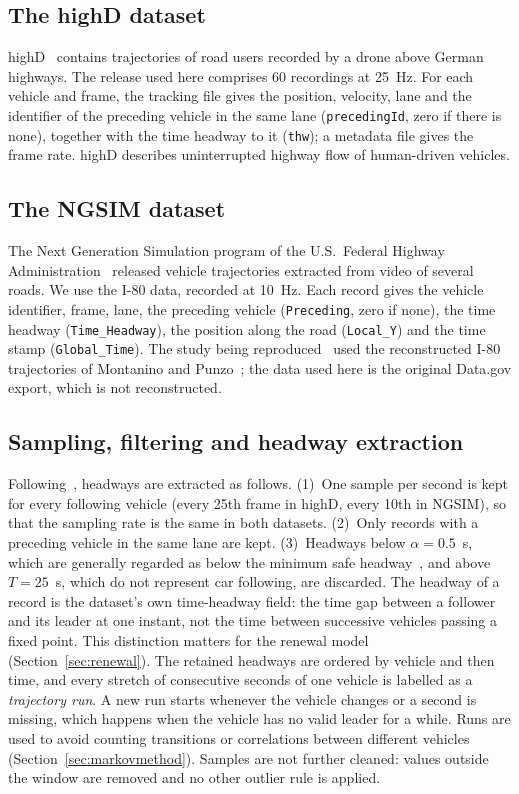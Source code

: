 \documentclass[11pt,a4paper]{article}
\numberwithin{equation}{section}
\begin{document}
\subsection{The highD dataset}
highD~\cite{krajewski2018} contains trajectories of road users recorded by a drone above German highways. The release used here comprises 60
recordings at 25~Hz. For each vehicle and frame, the tracking file gives the position, velocity, lane and the identifier
of the preceding vehicle in the same lane (\texttt{precedingId}, zero if there is none), together with the time headway to it
(\texttt{thw}); a metadata file gives the frame rate. highD describes uninterrupted highway flow of human-driven vehicles.

\subsection{The NGSIM dataset}
The Next Generation Simulation program of the U.S.\ Federal Highway Administration~\cite{ngsim} released vehicle
trajectories extracted from video of several roads. We use the I-80 data, recorded at 10~Hz. Each record gives the vehicle
identifier, frame, lane, the preceding vehicle (\texttt{Preceding}, zero if none), the time headway
(\texttt{Time\_Headway}), the position along the road (\texttt{Local\_Y}) and the time stamp (\texttt{Global\_Time}). The study being reproduced~\cite{leungbootnak} used the reconstructed I-80 trajectories of
Montanino and Punzo~\cite{montanino2015}; the data used here is the original Data.gov export, which is not reconstructed.

\subsection{Sampling, filtering and headway extraction}\label{sec:sampling}
Following~\cite{leungbootnak}, headways are extracted as follows. (1)~One sample per second is kept for every following
vehicle (every 25th frame in highD, every 10th in NGSIM), so that the sampling rate is the same in both datasets.
(2)~Only records with a preceding vehicle in the same lane are kept. (3)~Headways below $\alpha=0.5$~s, which are generally
regarded as below the minimum safe headway~\cite{taieb2001}, and above $T=25$~s, which do not represent car following, are discarded. The
headway of a record is the dataset's own time-headway field: the time gap between a follower and its leader at one instant, not the
time between successive vehicles passing a fixed point. This distinction matters for the renewal model
(Section~\ref{sec:renewal}). The retained headways are ordered by vehicle and then time, and every stretch of consecutive
seconds of one vehicle is labelled as a \emph{trajectory run}. A new run starts whenever the vehicle changes or a second is
missing, which happens when the vehicle has no valid leader for a while. Runs are used to avoid counting transitions
or correlations between different vehicles (Section~\ref{sec:markovmethod}). Samples are not further cleaned: values outside the window are removed and no other outlier rule is applied.
\end{document}
